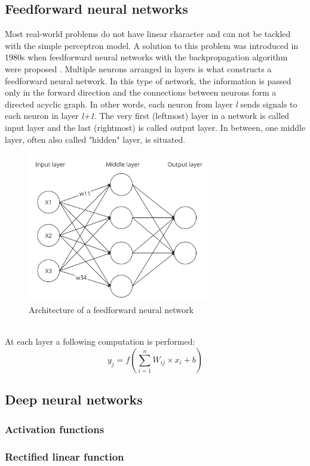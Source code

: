 \subsection*{Feedforward neural networks}
Most real-world problems do not have linear character and can not be tackled with the simple perceptron model. A solution to this problem was introduced in 1980s when feedforward neural networks with the backpropagation algorithm were proposed \cite{navrat2007umela}. Multiple neurons arranged in layers is what constructs a feedforward neural network. In this type of network, the information is passed only in the forward direction and the connections between neurons form a directed acyclic graph. In other words, each neuron from layer \textit{l} sends signals to each neuron in layer \textit{l+1}. The very first (leftmost) layer in a network is called input layer and the last (rightmost) is called output layer. In between, one middle layer, often also called "hidden" layer, is situated. \begin{figure}[!ht]
\centering
\includegraphics[width=8cm]{assets/images/FFN}
\caption{Architecture of a feedforward neural network
\label{fig:FFN}}
\end{figure}
\\At each layer a following computation is performed:
\begin{equation}
    y_{j}=f\left({\sum \limits _{i=1}^{n} W_{ij} \times x_{i} + b}\right)
\end{equation}

\subsection{Deep neural networks}
\subsubsection{Activation functions}
\subsubsection*{Rectified linear function}
